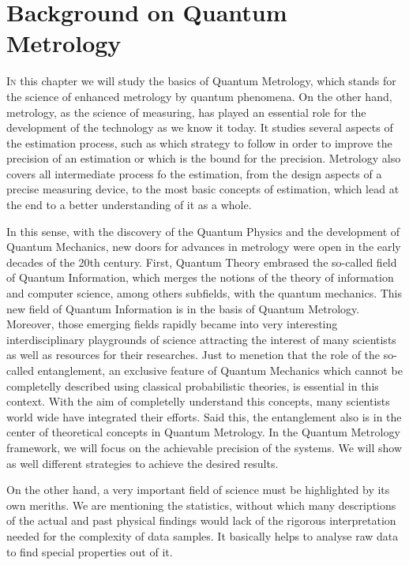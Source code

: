 \section[Backgroud on Quantum Metrology]
{Background on Quantum Metrology}



\vspace{0pt}
\lettrine[lines=2, findent=3pt,nindent=0pt]{I}{n} this chapter we will study the basics of Quantum Metrology, which stands for the science of enhanced metrology by quantum phenomena.
On the other hand, metrology, as the science of measuring, has played an essential role for the development of the technology as we know it today.
It studies several aspects of the estimation process, such as which strategy to follow in order to improve the precision of an estimation or which is the bound for the precision.
Metrology also covers all intermediate process fo the estimation, from the design aspects of a precise measuring device, to the most basic concepts of estimation, which lead at the end to a better understanding of it as a whole.

In this sense, with the discovery of the Quantum Physics and the development of Quantum Mechanics, new doors for advances in metrology were open in the early decades of the 20th century.
First, Quantum Theory embrased the so-called field of Quantum Information, which merges the notions of the theory of information and computer science, among others subfields, with the quantum mechanics.
This new field of Quantum Information is in the basis of Quantum Metrology.
Moreover, those emerging fields rapidly became into very interesting interdisciplinary playgrounds of science attracting the interest of many scientists as well as resources for their researches.
Just to menetion that the role of the so-called entanglement, an exclusive feature of Quantum Mechanics which cannot be completelly described using classical probabilistic theories, is essential in this context.
With the aim of completelly understand this concepts, many scientists world wide have integrated their efforts.
Said this, the entanglement also is in the center of theoretical concepts in Quantum Metrology.
In the Quantum Metrology framework, we will focus on the achievable precision of the systems.
We will show as well different strategies to achieve the desired results.

On the other hand, a very important field of science must be highlighted by its own meriths.
We are mentioning the statistics, without which many descriptions of the actual and past physical findings would lack of the rigorous interpretation needed for the complexity of data samples.
It basically helps to analyse raw data to find special properties out of it.

